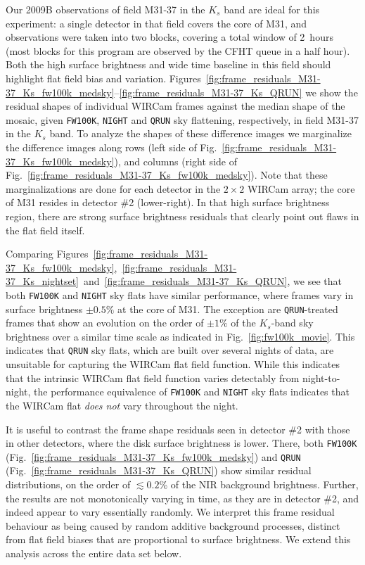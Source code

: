 \documentclass[iop]{emulateapj}
\newcommand{\Fig}[1]{Fig.~\ref{fig:#1}}  %
\begin{document}
Our 2009B observations of field M31-37 in the $K_s$ band are ideal for this experiment: a single detector in that field covers the core of M31, and observations were taken into two blocks, covering a total window of 2~hours (most blocks for this program are observed by the CFHT queue in a half hour).
Both the high surface brightness and wide time baseline in this field should highlight flat field bias and variation.
Figures~\ref{fig:frame_residuals_M31-37_Ks_fw100k_medsky}--\ref{fig:frame_residuals_M31-37_Ks_QRUN} we show the residual shapes of individual WIRCam frames against the median shape of the mosaic, given \texttt{FW100K}, \texttt{NIGHT} and \texttt{QRUN} sky flattening, respectively, in field M31-37 in the $K_s$ band.
To analyze the shapes of these difference images we marginalize the difference images along rows (left side of \Fig{frame_residuals_M31-37_Ks_fw100k_medsky}), and columns (right side of \Fig{frame_residuals_M31-37_Ks_fw100k_medsky}).
Note that these marginalizations are done for each detector in the $2\times2$ WIRCam array; the core of M31 resides in detector \#2 (lower-right).
In that high surface brightness region, there are strong surface brightness residuals that clearly point out flaws in the flat field itself.

Comparing Figures~\ref{fig:frame_residuals_M31-37_Ks_fw100k_medsky},~\ref{fig:frame_residuals_M31-37_Ks_nightset}~and~\ref{fig:frame_residuals_M31-37_Ks_QRUN}, we see that both \texttt{FW100K} and \texttt{NIGHT} sky flats have similar performance, where frames vary in surface brightness $\pm 0.5\%$ at the core of M31.
The exception are \texttt{QRUN}-treated frames that show an evolution on the order of $\pm 1\%$ of the $K_s$-band sky brightness over a similar time scale as indicated in \Fig{fw100k_movie}.
This indicates that \texttt{QRUN} sky flats, which are built over several nights of data, are unsuitable for capturing the WIRCam flat field function.
While this indicates that the intrinsic WIRCam flat field function varies detectably from night-to-night, the performance equivalence of \texttt{FW100K} and \texttt{NIGHT} sky flats indicates that the WIRCam flat \emph{does not} vary throughout the night.

It is useful to contrast the frame shape residuals seen in detector \#2 with those in other detectors, where the disk surface brightness is lower.
There, both \texttt{FW100K} (\Fig{frame_residuals_M31-37_Ks_fw100k_medsky}) and \texttt{QRUN} (\Fig{frame_residuals_M31-37_Ks_QRUN}) show similar residual distributions, on the order of $\lesssim 0.2$\% of the NIR background brightness.
Further, the results are not monotonically varying in time, as they are in detector \#2, and indeed appear to vary essentially randomly.
We interpret this frame residual behaviour as being caused by random additive background processes, distinct from flat field biases that are proportional to surface brightness.
We extend this analysis across the entire data set below.
\end{document}
